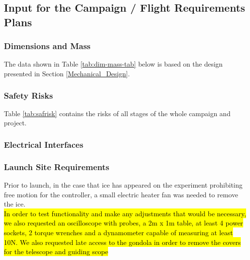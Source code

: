 \subsection{Input for the Campaign / Flight Requirements Plans}


\subsubsection{Dimensions and Mass}
\label{sec:dim-mass}

The data shown in Table \ref{tab:dim-mass-tab} below is based on the design presented in Section \ref{Mechanical_Design}. %



\subsubsection{Safety Risks}
Table \ref{tab:safrisk} contains the risks of all stages of the whole campaign and project.


\subsubsection{Electrical Interfaces}




\subsubsection{Launch Site Requirements}
Prior to launch, in the case that ice has appeared on the experiment prohibiting free motion for the controller, a small electric heater fan was needed to remove the ice. \\

\hl{In order to test functionality and make any adjustments that would be necessary, we also requested an oscilloscope with probes, a 2m x 1m table, at least 4 power sockets, 2 torque wrenches and a dynamometer capable of measuring at least 10N. We also requested late access to the gondola in order to remove the covers for the telescope and guiding scope}

